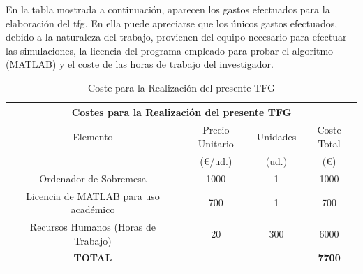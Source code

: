 En la tabla mostrada a continuación, aparecen los gastos efectuados para la elaboración del \acrlong{tfg}. En ella puede apreciarse que los únicos gastos efectuados, debido a la naturaleza del trabajo, provienen del equipo necesario para efectuar las simulaciones, la licencia del programa empleado para probar el algoritmo (MATLAB) y el coste de las horas de trabajo del investigador. \par 

\begin{table}[h]
\centering
\begin{tabular}[c]{ c c c c }
\hline
\multicolumn{4}{c}{\textbf{Costes para la Realización del presente TFG}} \\
\hline
Elemento & Precio Unitario & Unidades & Coste Total \\
 & (\euro{}/ud.) & (ud.) &  (\euro{}) \\
\hline
Ordenador de Sobremesa & 1000 & 1 & 1000 \\
Licencia de MATLAB para uso académico\footnotemark & 700 & 1 & 700 \\
Recursos Humanos (Horas de Trabajo) & 20 & 300 & 6000 \\
\hline
\textbf{TOTAL} & & & \textbf{7700} \\
\hline
\end{tabular}
\caption{Coste para la Realización del presente TFG}
\end{table}

